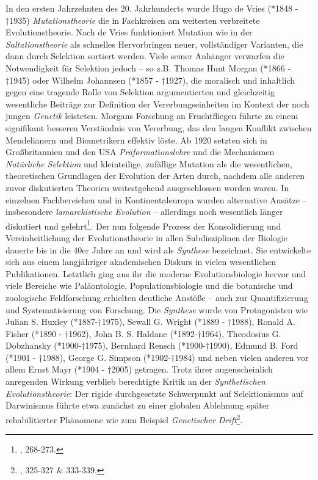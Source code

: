 \documentclass[openany,twoside,twocolumn]{book}
\let\rmarkdownfootnote\footnote%
\def\footnote{\protect\rmarkdownfootnote}
\begin{document}
In den ersten Jahrzehnten des 20. Jahrhunderts wurde Hugo de Vries
(*1848 - †1935) \emph{Mutationstheorie} die in Fachkreisen am weitesten
verbreitete Evolutionstheorie. Nach de Vries funktioniert Mutation wie
in der \emph{Saltationstheorie} als schnelles Hervorbringen neuer,
vollständiger Varianten, die dann durch Selektion sortiert werden. Viele
seiner Anhänger verwarfen die Notwendigkeit für Selektion jedoch -- so
z.B. Thomas Hunt Morgan (*1866 - †1945) oder Wilhelm Johannsen (*1857 -
†1927), die moralisch und inhaltlich gegen eine tragende Rolle von
Selektion argumentierten und gleichzeitig wesentliche Beiträge zur
Definition der Vererbungseinheiten im Kontext der noch jungen
\emph{Genetik} leisteten. Morgans Forschung an Fruchtfliegen führte zu
einem signifikant besseren Verständnis von Vererbung, das den langen
Konflikt zwischen Mendelianern und Biometrikern effektiv löste. Ab 1920
setzten sich in Großbritannien und den USA \emph{Präformationslehre} und
die Mechanismen \emph{Natürliche Selektion} und kleinteilige, zufällige
Mutation als die wesentlichen, theoretischen Grundlagen der Evolution
der Arten durch, nachdem alle anderen zuvor diskutierten Theorien
weitestgehend ausgeschlossen worden waren. In einzelnen Fachbereichen
und in Kontinentaleuropa wurden alternative Ansätze -- insbesondere
\emph{lamarckistische Evolution} -- allerdings noch wesentlich länger
diskutiert und gelehrt\footnote{\textcite{bowler_evolution_1989},
  268-273.}. Der nun folgende Prozess der Konsolidierung und
Vereinheitlichung der Evolutionstheorie in allen Subdisziplinen der
Biologie dauerte bis in die 40er Jahre an und wird als \emph{Synthese}
bezeichnet. Sie entwickelte sich aus einem langjähriger akademischen
Diskurs in vielen wesentlichen Publikationen. Letztlich ging aus ihr die
moderne Evolutionsbiologie hervor und viele Bereiche wie Paläontologie,
Populationsbiologie und die botanische und zoologische Feldforschung
erhielten deutliche Anstöße -- auch zur Quantifizierung und
Systematisierung von Forschung. Die \emph{Synthese} wurde von
Protagonisten wie Julian S. Huxley (*1887-†1975), Sewall G. Wright
(*1889 - †1988), Ronald A. Fisher (*1890 - †1962), John B. S. Haldane
(*1892-†1964), Theodosius G. Dobzhansky (*1900-†1975), Bernhard Rensch
(*1900-†1990), Edmund B. Ford (*1901 - †1988), George G. Simpson
(*1902-†1984) und neben vielen anderen vor allem Ernst Mayr (*1904 -
†2005) getragen. Trotz ihrer augenscheinlich anregenden Wirkung verblieb
berechtigte Kritik an der \emph{Synthetischen Evolutionstheorie}: Der
rigide durchgesetzte Schwerpunkt auf Selektionismus auf Darwinismus
führte etwa zunächst zu einer globalen Ablehnung später rehabilitierter
Phänomene wie zum Beispiel \emph{Genetischer Drift}\footnote{\textcite{bowler_evolution_1989},
  325-327 \& 333-339.}.
\end{document}
